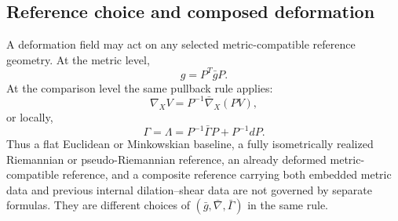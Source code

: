 \documentclass[12pt]{amsart}
\theoremstyle{definition}
\theoremstyle{remark}
\begin{document}
\subsection{Reference choice and composed deformation}\label{subsec:fixed_reference_composed_v2}

A deformation field may act on any selected metric-compatible reference geometry.  At the metric level,
\begin{equation}\label{eq:metric_level_arbitrary_reference_v3}
 g=P^T\bar gP.
\end{equation}
At the comparison level the same pullback rule applies:
\begin{equation}\label{eq:compensation_general_reference_form}
 \nabla_XV=P^{-1}\bar\nabla_X(PV),
\end{equation}
or locally,
\begin{equation}\label{eq:unified_natural_connection_formula}
 \Gamma=\Lambda=P^{-1}\bar\Gamma P+P^{-1}dP.
\end{equation}
Thus a flat Euclidean or Minkowskian baseline, a fully isometrically realized Riemannian or pseudo-Riemannian reference, an already deformed metric-compatible reference, and a composite reference carrying both embedded metric data and previous internal dilation--shear data are not governed by separate formulas.  They are different choices of \((\bar g,\bar\nabla,\bar\Gamma)\) in the same rule.
\end{document}
